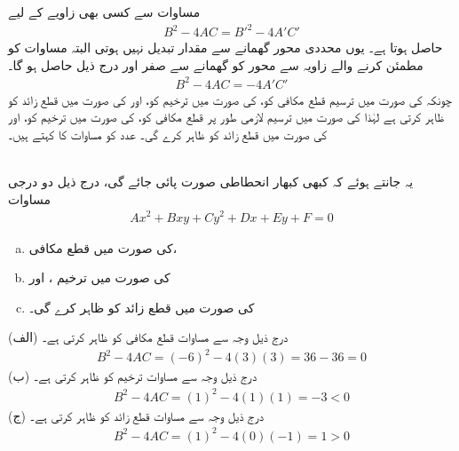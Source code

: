 مساوات  سے کسی بھی زاویے  کے لیے 
\begin{align}\label{مساوات_مخروط_تبدیل_نہیں_ہوتا}
B^2-4AC=B'^2-4A'C'
\end{align}
حاصل ہوتا ہے۔ یوں محددی محور گھمانے سے مقدار  تبدیل نہیں ہوتی البتہ مساوات  کو مطمئن کرنے والے  زاویہ  سے محور کو  گھمانے سے  صفر اور درج ذیل حاصل ہو گا۔
\begin{align*}
B^2-4AC=-4A'C'
\end{align*}  
چونکہ  کی صورت میں ترسیم قطع مکافی کو،  کی صورت میں ترخیم کو،  اور  کی صورت میں قطع زائد  کو ظاہر کرتی ہے   لہٰذا  کی صورت میں ترسیم لازمی طور پر قطع مکافی کو،  کی صورت میں ترخیم  کو، اور  کی صورت میں قطع زائد کو ظاہر کرے گی۔ عدد  کو مساوات  کا  کہتے ہیں۔

\\
یہ جانتے ہوئے کہ کبھی کبھار انحطاطی صورت پائی جائے گی، درج ذیل دو درجی مساوات 
\begin{align*}
Ax^2+Bxy+Cy^2+Dx+Ey+F=0
\end{align*}
\begin{enumerate}[a.]
\item
{} کی صورت میں قطع مکافی،
\item
{} کی صورت میں ترخیم  ، اور
\item
{} کی صورت میں قطع زائد کو ظاہر کرے گی۔
\end{enumerate}

(الف) درج ذیل وجہ سے مساوات   قطع مکافی کو ظاہر کرتی ہے۔
\begin{align*}
B^2-4AC=(-6)^2-4(3)(3)=36-36=0
\end{align*}
(ب) درج ذیل وجہ سے  مساوات  ترخیم کو ظاہر کرتی ہے۔
\begin{align*}
B^2-4AC=(1)^2-4(1)(1)=-3<0
\end{align*}
(ج) درج ذیل  وجہ سے مساوات   قطع زائد کو ظاہر کرتی ہے۔
\begin{align*}
B^2-4AC=(1)^2-4(0)(-1)=1>0
\end{align*}

